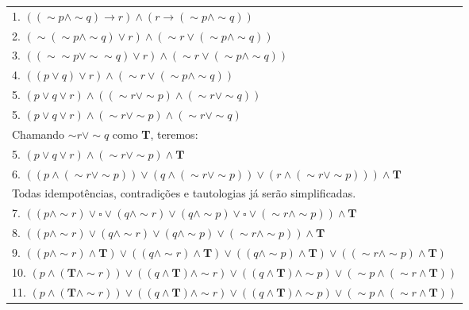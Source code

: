 \documentclass[12pt, a4paper,final]{article}
\begin{document}
\begin{enumerate}
\begin{enumerate}[label=(\alph*), leftmargin = 5mm]
                \begin{tabular}{l}
                    1. $((\sim p \wedge \sim q) \rightarrow r) \wedge (r \rightarrow (\sim p \wedge \sim q))$\\
                    2. $(\sim(\sim p \wedge \sim q) \vee r) \wedge (\sim r \vee (\sim p \wedge \sim q))$ \\
                    3. $((\sim \sim p \vee \sim \sim q) \vee r) \wedge (\sim r \vee (\sim p \wedge \sim q))$\\
                    4. $((p \vee q) \vee r) \wedge (\sim r \vee (\sim p \wedge \sim q))$\\
                    5. $(p \vee q \vee r) \wedge ((\sim r \vee \sim p) \wedge (\sim r \vee \sim q))$\\ 
                    5. $(p \vee q \vee r) \wedge (\sim r \vee \sim p) \wedge (\sim r \vee \sim q)$\\
                    Chamando $\sim r \vee \sim q$ como \textbf{T}, teremos:\\
                    5. $(p \vee q \vee r) \wedge (\sim r \vee \sim p) \wedge \textbf{T}$ \\
                    6. $((p \wedge (\sim r \vee \sim p)) \vee (q \wedge (\sim r \vee \sim p)) \vee (r \wedge (\sim r \vee \sim p))) \wedge \textbf{T}$\\ 
                    Todas idempotências, contradições e tautologias já serão simplificadas.\\
                    7. $((p \wedge \sim r) \vee \square \vee (q \wedge \sim r) \vee (q \wedge \sim p) \vee \square \vee (\sim r \wedge \sim p)) \wedge \textbf{T}$\\
                    8. $((p \wedge \sim r) \vee (q \wedge \sim r) \vee (q \wedge \sim p) \vee (\sim r \wedge \sim p)) \wedge \textbf{T}$\\
                    9. $((p \wedge \sim r) \wedge \textbf{T}) \vee ((q \wedge \sim r) \wedge \textbf{T}) \vee ((q \wedge \sim p) \wedge \textbf{T}) \vee ((\sim r \wedge \sim p) \wedge \textbf{T})$\\
                    10. $(p \wedge (\textbf{T} \wedge \sim r)) \vee ((q \wedge \textbf{T}) \wedge \sim r) \vee ((q \wedge \textbf{T}) \wedge \sim p ) \vee (\sim p \wedge (\sim r \wedge \textbf{T}))$ \\
                    11. $(p \wedge (\textbf{T} \wedge \sim r)) \vee ((q \wedge \textbf{T}) \wedge \sim r) \vee ((q \wedge \textbf{T}) \wedge \sim p ) \vee (\sim p \wedge (\sim r \wedge \textbf{T}))$\\

\end{tabular}
\end{enumerate}
\end{enumerate}
\end{document}
